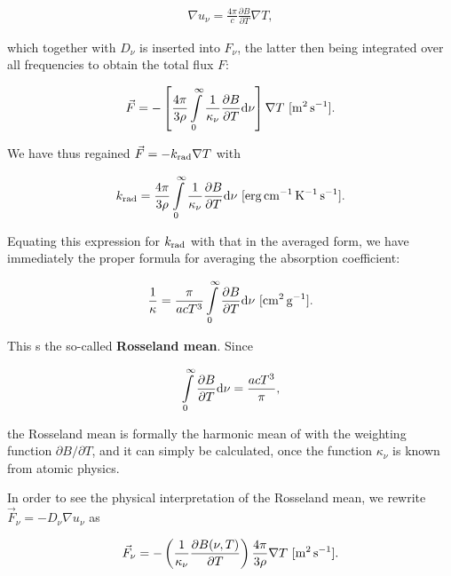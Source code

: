 \documentclass[a4paper,10pt]{article}
\begin{document}
\begin{align*}
    \nabla u_\nu = \frac{4\pi}{c} \frac{\partial B}{\partial T}\nabla T,
\end{align*}

{\noindent}which together with $D_\nu$ is inserted into  $F_\nu$, the latter then being integrated over all frequencies to obtain the total flux $F$: 

\begin{align*}
    \vec{F} = -\left[ \frac{4\pi}{3\rho} \int\limits_0^\infty \frac{1}{\kappa_\nu} \frac{\partial B}{\partial T} {\rm d}\nu \right] \nabla T ~ [{\rm m^2\,s^{-1}}].
\end{align*}

{\noindent}We have thus regained $\vec{F}=-k_{\rm rad}\nabla T$ with

\begin{align*}
    k_{\rm rad} = \frac{4\pi}{3\rho} \int\limits_0^\infty \frac{1}{\kappa_\nu} \frac{\partial B}{\partial T} {\rm d}\nu ~ [{\rm erg\,cm^{-1}\,K^{-1}\,s^{-1}}].
\end{align*}

{\noindent}Equating this expression for $k_{\rm rad}$ with that in the averaged form, we have immediately the proper formula for averaging the absorption coefficient:

\begin{align*}
    \frac{1}{\kappa} = \frac{\pi}{acT^3} \int\limits_0^\infty \frac{\partial B}{\partial T} {\rm d}\nu ~ [{\rm cm^2\,g^{-1}}].
\end{align*}

{\noindent}This s the so-called \textbf{Rosseland mean}. Since

\begin{align*}
    \int\limits_0^\infty \frac{\partial B}{\partial T}{\rm d}\nu = \frac{acT^3}{\pi},
\end{align*}

{\noindent}the Rosseland mean is formally the harmonic mean of    with the weighting function $\partial B/\partial T$, and it can simply be calculated, once the function $\kappa_\nu$ is known from atomic physics.

{\noindent}In order to see the physical interpretation of the Rosseland mean, we rewrite $\vec{F}_\nu=-D_\nu\nabla u_\nu$ as

\begin{align*}
    \vec{F}_\nu = -\left(\frac{1}{\kappa_\nu}\frac{\partial B(\nu,T)}{\partial T}\right)\frac{4\pi}{3\rho}\nabla T ~ [{\rm m^2\,s^{-1}}].
\end{align*}
\end{document}
